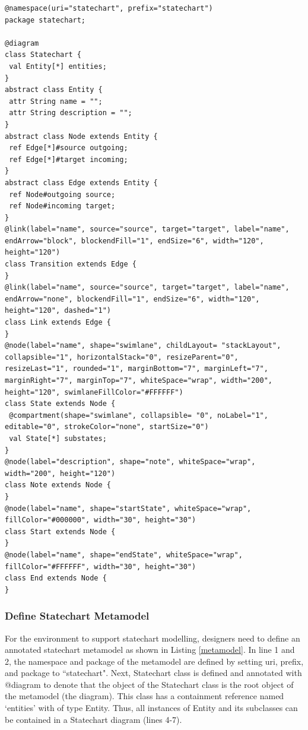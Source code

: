 \documentclass[10pt, a4paper]{report} \usepackage[titletoc]{appendix}
\begin{document}
\begin{lstlisting}[style=interfaces,caption={A definition of statechart diagram using Emfatic and Eugenia-like annotations.},label=metamodel]
@namespace(uri="statechart", prefix="statechart")
package statechart;

@diagram
class Statechart {
 val Entity[*] entities;
}
abstract class Entity {
 attr String name = "";
 attr String description = "";
}
abstract class Node extends Entity {
 ref Edge[*]#source outgoing;
 ref Edge[*]#target incoming;
}
abstract class Edge extends Entity {
 ref Node#outgoing source;
 ref Node#incoming target;
}
@link(label="name", source="source", target="target", label="name", endArrow="block", blockendFill="1", endSize="6", width="120", height="120")
class Transition extends Edge {
}
@link(label="name", source="source", target="target", label="name", endArrow="none", blockendFill="1", endSize="6", width="120", height="120", dashed="1")
class Link extends Edge {
}
@node(label="name", shape="swimlane", childLayout= "stackLayout", collapsible="1", horizontalStack="0", resizeParent="0", resizeLast="1", rounded="1", marginBottom="7", marginLeft="7", marginRight="7", marginTop="7", whiteSpace="wrap", width="200", height="120", swimlaneFillColor="#FFFFFF")
class State extends Node {
 @compartment(shape="swimlane", collapsible= "0", noLabel="1", editable="0", strokeColor="none", startSize="0")
 val State[*] substates;
}
@node(label="description", shape="note", whiteSpace="wrap", width="200", height="120")
class Note extends Node {
}
@node(label="name", shape="startState", whiteSpace="wrap", fillColor="#000000", width="30", height="30")
class Start extends Node {
}
@node(label="name", shape="endState", whiteSpace="wrap", fillColor="#FFFFFF", width="30", height="30")
class End extends Node {
}
\end{lstlisting} 

\subsubsection{Define Statechart Metamodel}
For the environment to support statechart modelling, designers need to define an annotated statechart metamodel as shown in Listing \ref{metamodel}. In line 1 and 2, the namespace and package of the metamodel are defined by setting uri, prefix, and package to ``statechart". Next, Statechart class is defined and annotated with {\selectfont @diagram} to denote that the object of the Statechart class is the root object of the metamodel (the diagram). This class has a containment reference named `entities' with of type Entity. Thus, all instances of Entity and its subclasses can be contained in a Statechart diagram (lines 4-7). 
\end{document}
